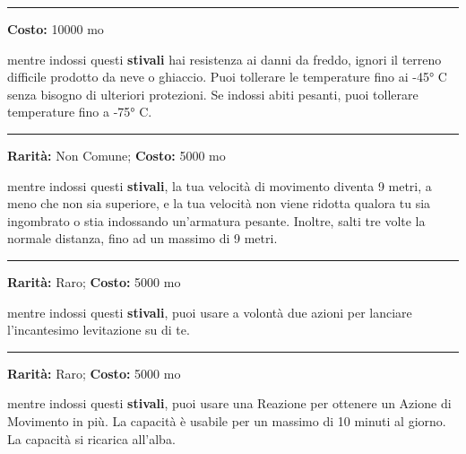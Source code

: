 \begin{multicols}{2}
\smallskip\noindent\rule{\linewidth}{2pt}  \hypertarget{Stivalidell'Inverno}{}\medskip{}\noindent\label{Stivalidell'Inverno}

\textbf{Costo:} 10000 mo

mentre indossi questi \textbf{stivali} hai resistenza ai danni da freddo, ignori il terreno difficile prodotto da neve o ghiaccio. Puoi tollerare le temperature fino ai -45° C senza bisogno di ulteriori protezioni. Se indossi abiti pesanti, puoi tollerare temperature fino a -75° C.

\smallskip\noindent\rule{\linewidth}{2pt}  \hypertarget{StivalidellaCorsaedelSalto}{}\medskip{}\noindent\label{StivalidellaCorsaedelSalto}

\textbf{Rarità:} Non Comune; \textbf{Costo:} 5000 mo

mentre indossi questi \textbf{stivali}, la tua velocità di movimento diventa 9 metri, a meno che non sia superiore, e la tua velocità non viene ridotta qualora tu sia ingombrato o stia indossando un'armatura pesante. Inoltre, salti tre volte la normale distanza, fino ad un massimo di 9 metri.

\smallskip\noindent\rule{\linewidth}{2pt}  \hypertarget{StivalidellaLevitazione}{}\medskip{}\noindent\label{StivalidellaLevitazione}

\textbf{Rarità:} Raro; \textbf{Costo:} 5000 mo

mentre indossi questi \textbf{stivali}, puoi usare a volontà due azioni per lanciare l'incantesimo levitazione su di te.

\smallskip\noindent\rule{\linewidth}{2pt}  \hypertarget{StivalidellaVelocità}{}\medskip{}\noindent\label{StivalidellaVelocità}

\textbf{Rarità:} Raro; \textbf{Costo:} 5000 mo

mentre indossi questi \textbf{stivali}, puoi usare una Reazione per ottenere un Azione di Movimento in più. La capacità è usabile per un massimo di 10 minuti al giorno. La capacità si ricarica all'alba.


\end{multicols}

